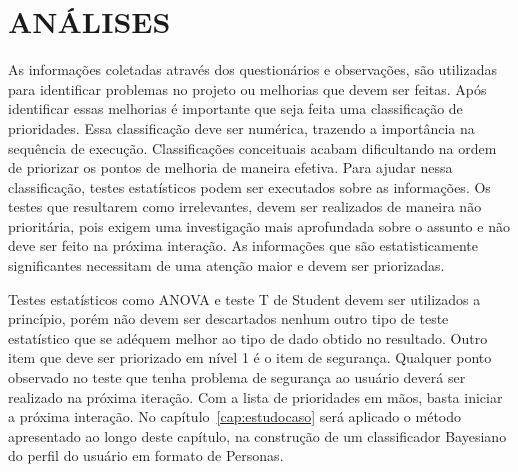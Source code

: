 \section{ANÁLISES}
\label{sec:analise}
As informações coletadas através dos questionários e observações, são utilizadas para identificar problemas no projeto ou melhorias que devem ser feitas. Após identificar essas melhorias é importante que seja feita uma classificação de prioridades. Essa classificação deve ser numérica, trazendo a importância na sequência de execução. Classificações conceituais acabam dificultando na ordem de priorizar os pontos de melhoria de maneira efetiva. Para ajudar nessa classificação, testes estatísticos podem ser executados sobre as informações. Os testes que resultarem como irrelevantes, devem ser realizados de maneira não prioritária, pois exigem uma investigação mais aprofundada sobre o assunto e não deve ser feito na próxima interação. As informações que são estatisticamente significantes necessitam de uma atenção maior e devem ser priorizadas. 

Testes estatísticos como ANOVA e teste T de Student devem ser utilizados a princípio, porém não devem ser descartados nenhum outro tipo de teste estatístico que se adéquem melhor ao tipo de dado obtido no resultado. Outro item que deve ser priorizado em nível 1 é o item de segurança. Qualquer ponto observado no teste que tenha problema de segurança ao usuário deverá ser realizado na próxima iteração. Com a lista de prioridades em mãos, basta iniciar a próxima interação. No capítulo~\ref{cap:estudocaso} será aplicado o método apresentado ao longo deste capítulo, na construção de um classificador Bayesiano do perfil do usuário em formato de Personas.